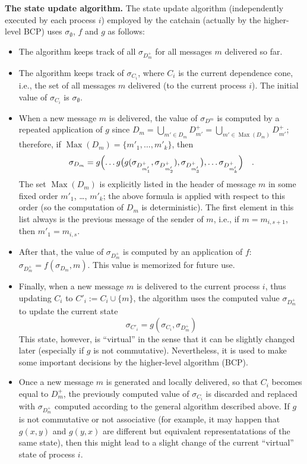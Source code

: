\documentclass[12pt,oneside]{article}
\def\makepoint#1{\medbreak\noindent{\bf #1.\ }}
\def\nxsubpoint{\refstepcounter{subsubsection}%
  \smallbreak\makepoint{\thesubsubsection}}
\def\emb#1{\textbf{#1.}}
\def\Max{\operatorname{Max}}
\begin{document}
\nxsubpoint\emb{The state update algorithm}
The state update algorithm (independently executed by each process $i$) employed by the catchain (actually by the higher-level BCP) uses $\sigma_\emptyset$, $f$ and $g$ as follows:
\begin{itemize}
\item The algorithm keeps track of all $\sigma_{D^+_m}$ for all messages $m$ delivered so far.
\item The algorithm keeps track of $\sigma_{C_i}$, where $C_i$ is the current dependence cone, i.e., the set of all messages $m$ delivered (to the current process $i$). The initial value of $\sigma_{C_i}$ is $\sigma_\emptyset$.
\item When a new message $m$ is delivered, the value of $\sigma_{D^m}$ is computed by a repeated application of $g$ since $D_m=\bigcup_{m'\in D_m}D^+_{m'}=\bigcup_{m'\in\Max(D_m)}D^+_{m'}$; therefore, if $\Max(D_m)=\{m'_1,\ldots,m'_k\}$, then
  \begin{equation}\label{eq:merge.many}
    \sigma_{D_m}=g\Bigl(\ldots g\bigl(g(\sigma_{D^+_{m'_1}},\sigma_{D^+_{m'_2}}),\sigma_{D^+_{m'_3}}\bigr),\ldots \sigma_{D^+_{m'_k}}\Bigr)\quad. 
  \end{equation}
The set $\Max(D_m)$ is explicitly listed in the header of message $m$ in some fixed order $m'_1$, \dots, $m'_k$; the above formula is applied with respect to this order (so the computation of $D_m$ is deterministic). The first element in this list always is the previous message of the sender of $m$, i.e., if $m=m_{i,s+1}$, then $m'_1=m_{i,s}$.
\item After that, the value of $\sigma_{D^+_m}$ is computed by an application of $f$: $\sigma_{D^+_m}=f(\sigma_{D_m},m)$. This value is memorized for future use.
\item Finally, when a new message $m$ is delivered to the current process $i$, thus updating $C_i$ to $C'_i:=C_i\cup\{m\}$, the algorithm uses the computed value $\sigma_{D^+_m}$ to update the current state
  \begin{equation}
    \sigma_{C'_i}=g(\sigma_{C_i},\sigma_{D^+_m})
  \end{equation}
  This state, however, is ``virtual'' in the sense that it can be slightly changed later (especially if $g$ is not commutative). Nevertheless, it is used to make some important decisions by the higher-level algorithm (BCP).
\item Once a new message $m$ is generated and locally delivered, so that $C_i$ becomes equal to $D^+_m$, the previously computed value of $\sigma_{C_i}$ is discarded and replaced with $\sigma_{D^+_m}$ computed according to the general algorithm described above. If $g$ is not commutative or not associative (for example, it may happen that $g(x,y)$ and $g(y,x)$ are different but equivalent representatations of the same state), then this might lead to a slight change of the current ``virtual'' state of process $i$.

\end{itemize}
\end{document}
